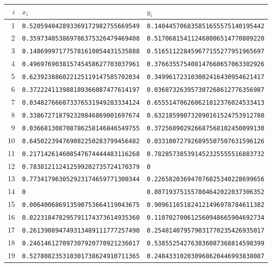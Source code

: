 \begin{center}\footnotesize
\begin{tabular}{@{}rll@{}}
\toprule
$i$ & $x_i$ & $y_i$\\
\midrule
1 & \texttt{0.520594042893369172982755669549} & \texttt{0.140445706835851655575140195442}\\
2 & \texttt{0.359734053869786375326479469408} & \texttt{0.517068154112468006514770809220}\\
3 & \texttt{0.148699971775781610054431535888} & \texttt{0.516511228459677155277951965697}\\
4 & \texttt{0.496976903815745458627703037961} & \texttt{0.376635575408147660657063302926}\\
5 & \texttt{0.623923886022125119147585702034} & \texttt{0.349961723103002416430954621417}\\
6 & \texttt{0.372224113988189366087477614197} & \texttt{0.036873263957307268612776356987}\\
7 & \texttt{0.034827666073376531949283334124} & \texttt{0.655514706260621812376024533413}\\
8 & \texttt{0.338672718792320846869001697674} & \texttt{0.632185990732090161524753912780}\\
9 & \texttt{0.036681308708786258146846549755} & \texttt{0.372560902926687568102450099130}\\
10 & \texttt{0.645022394769082250283799456482} & \texttt{0.033100727926895507507631596126}\\
11 & \texttt{0.217142614608547674444483116268} & \texttt{0.782857385391452325555516883732}\\
12 & \texttt{0.783812112412599202735724170379} & \texttt{0}\\
13 & \texttt{0.773417963052923174659771300344} & \texttt{0.226582036947076825340228699656}\\
14 & \texttt{0} & \texttt{0.807193751557804642022037306352}\\
15 & \texttt{0.006400686913590753664119043675} & \texttt{0.909611651824121496978784611382}\\
16 & \texttt{0.022318478295791174373614935360} & \texttt{0.110702700612560948665904692734}\\
17 & \texttt{0.261390894749313489111777257490} & \texttt{0.254814079579031770235426935017}\\
18 & \texttt{0.246146127097307920770921236017} & \texttt{0.538552542763836087368814598399}\\
19 & \texttt{0.527808235310301738624910711365} & \texttt{0.248433102030968620446993838087}\\

\end{tabular}
\end{center}
